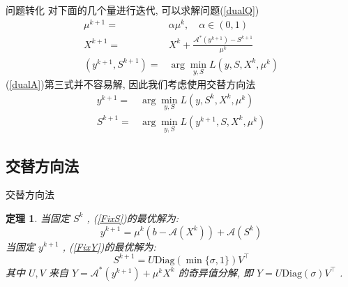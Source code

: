 \documentclass[slidestop, compress, mathserif, UTF8]{beamer}
\newtheorem{theo}{\bf \textcolor[rgb]{0.8,0,0}{定理}}[section]          %
\numberwithin{equation}{section}                                        %
\begin{document}
            \begin{frame}[t]{问题转化}
                对下面的几个量进行迭代, 可以求解问题(\ref{dualQ})
                \begin{equation}
                    \begin{split}\label{dualA}
                            \mu^{k + 1}
                        =	& \alpha \mu^k, \quad \alpha \in (0,1)\\
                            X^{k + 1}
                        =	& X^k + \frac{\mathcal{A}^*(y^{k + 1}) - S^{k + 1}}{\mu^k}\\
                            (y^{k + 1}, S^{k + 1}) 
                        =	& \arg \min_{y, S}L(y, S, X^k, \mu^k)
                    \end{split}
                \end{equation}
                (\ref{dualA})第三式并不容易解, 因此我们考虑使用交替方向法
                \begin{align}
                        y^{k + 1}
                    =	& \arg \min_{y, S}L(y, S^k, X^k, \mu^k) \label{FixS}\\
                        S^{k + 1}
                    =	& \arg \min_{y, S}L(y^{k + 1}, S, X^k, \mu^k) \label{FixY}
                \end{align}
            \end{frame}
        \subsection{交替方向法}
            \begin{frame}[t]{交替方向法}
                \begin{theo}
                    当固定 $S^k$ , (\ref{FixS})的最优解为:
                        \begin{equation}\label{dualAY}
                            y^{k + 1} = \mu^k(b - \mathcal{A}(X^k)) + \mathcal{A}(S^k)
                        \end{equation}
                    当固定 $y^{k + 1}$ , (\ref{FixY})的最优解为:
                        \begin{equation}\label{dualAS}
                            S^{k + 1} = U \text{Diag}(\min \{\sigma, 1\}) V^\top
                        \end{equation}
                    其中 $U, V$ 来自 $Y = \mathcal{A}^*(y^{k + 1}) + \mu^k X^k$ 的奇异值分解, 即 $Y = U \text{Diag}(\sigma) V^\top$ .
                \end{theo}
            \end{frame}
\end{document}
